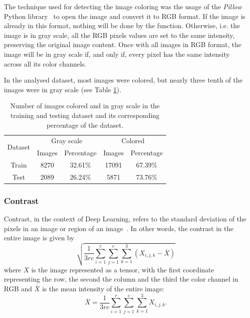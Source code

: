 \documentclass[12pt,
    brazil,			%
	english,        %
	]{article}
\begin{document}
The technique used for detecting the image coloring was the usage of the \textit{Pillow} Python library~\cite{pillow2019docs} to open the image and convert it to RGB format. If the image is already in this format, nothing will be done by the function. Otherwise, i.e. the image is in gray scale, all the RGB pixels values are set to the same intensity, preserving the original image content. Once with all images in RGB format, the image will be in gray scale if, and only if, every pixel has the same intensity across all its color channels.

In the analysed dataset, most images were colored, but nearly three tenth of the images were in gray scale (see Table \ref{tab:color}).

\begin{table}[htb]
    \centering
    \setlength{\tabcolsep}{20pt} %
    \renewcommand{\arraystretch}{1.5} %
    \begin{tabular}{*{5}{c}}
        \toprule
        \multirow{2}{*}{Dataset}    & \multicolumn{2}{c}{Gray scale}    &   \multicolumn{2}{c}{Colored} \\
        \cmidrule(r){2-3} \cmidrule(r){4-5}
                                    & Images & Percentage               & Images & Percentage \\
        \midrule
        Train                       &   8270 &  32.61\%                 &  17091 &     67.39\% \\
        Test                        &   2089 &  26.24\%                 &   5871 &     73.76\% \\
        \bottomrule
    \end{tabular}
    \caption{Number of images colored and in gray scale in the training and testing dataset and its corresponding percentage of the dataset.}
    \label{tab:color}
\end{table}

\subsubsection{Contrast}

Contrast, in the context of Deep Learning, refers to the standard deviation of the pixels in an image or region of an image~\cite{goodfellow2016deep}. In other words, the contrast in the entire image is given by
\begin{equation}
\label{eq:constrast-rgb}
    \sqrt{\frac{1}{3rc}\sum_{i=1}^{r} \sum_{j=1}^{c} \sum_{k=1}^{3} \left(X_{i,j,k} - \bar{X}\right)}
\end{equation}
where $X$ is the image represented as a tensor, with the first coordinate representing the row, the second the column and the third the color channel in RGB and $\bar{X}$ is the mean intensity of the entire image:
\begin{equation}
    \bar{X} = \frac{1}{3rc} \sum_{i=1}^{r} \sum_{j=1}^{c} \sum_{k=1}^{3} X_{i,j,k}.
\end{equation}
\end{document}
